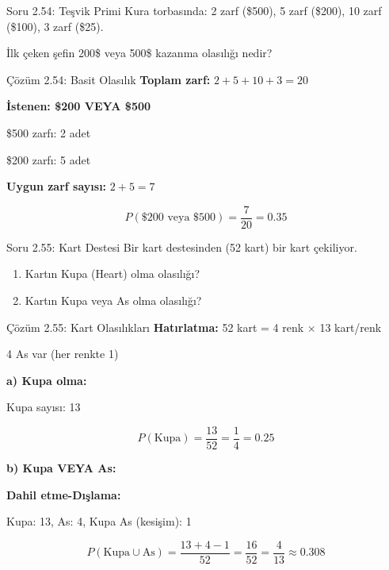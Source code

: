 \documentclass[light]{lutbeamer}
\begin{document}
\begin{frame}{Soru 2.54: Teşvik Primi}
    Kura torbasında: 2 zarf (\$500), 5 zarf (\$200), 10 zarf (\$100), 3 zarf (\$25).
    
    İlk çeken şefin 200\$ veya 500\$ kazanma olasılığı nedir?
\end{frame}

\begin{frame}{Çözüm 2.54: Basit Olasılık}
    \color{blue}
    \textbf{Toplam zarf:} $2 + 5 + 10 + 3 = 20$
    
    \vspace{0.3cm}
    \textbf{İstenen: \$200 VEYA \$500}
    
    \$500 zarfı: 2 adet
    
    \$200 zarfı: 5 adet
    
    \vspace{0.3cm}
    \textbf{Uygun zarf sayısı:} $2 + 5 = 7$
    
    \[ P(\$200 \text{ veya } \$500) = \frac{7}{20} = 0.35 \]
    
    \begin{center}
    \end{center}
\end{frame}

\begin{frame}{Soru 2.55: Kart Destesi}
    Bir kart destesinden (52 kart) bir kart çekiliyor.
    \begin{enumerate}
        \item Kartın Kupa (Heart) olma olasılığı?
        \item Kartın Kupa veya As olma olasılığı?
    \end{enumerate}
\end{frame}

\begin{frame}{Çözüm 2.55: Kart Olasılıkları}
    \color{blue}
    \textbf{Hatırlatma:} 52 kart = 4 renk $\times$ 13 kart/renk
    
    4 As var (her renkte 1)
    
    \vspace{0.3cm}
    \textbf{a) Kupa olma:}
    
    Kupa sayısı: 13
    
    \[ P(\text{Kupa}) = \frac{13}{52} = \frac{1}{4} = 0.25 \]
    
    \vspace{0.5cm}
    \textbf{b) Kupa VEYA As:}
    
    \textbf{Dahil etme-Dışlama:}
    
    Kupa: 13, As: 4, Kupa As (kesişim): 1
    
    \[ P(\text{Kupa} \cup \text{As}) = \frac{13 + 4 - 1}{52} = \frac{16}{52} = \frac{4}{13} \approx 0.308 \]
\end{frame}

\end{document}
